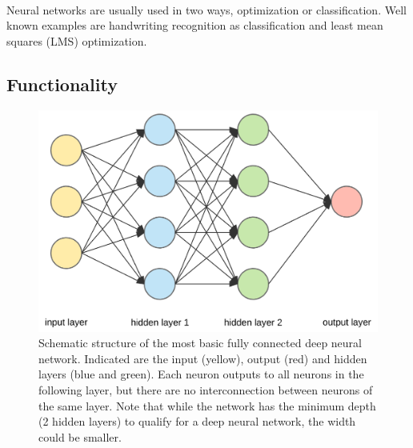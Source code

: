 		~\\
		Neural networks are usually used in two ways, optimization or classification. Well known examples are handwriting recognition as classification and least mean squares (LMS) optimization.
		\subsection{Functionality}
			\label{NNExample}
			
			\begin{figure}
				\includegraphics[width=\textwidth]{images/simpleNN.png}
				\caption{Schematic structure of the most basic fully connected deep neural network. Indicated are the input (yellow), output (red) and hidden layers (blue and green). Each neuron outputs to all neurons in the following layer, but there are no interconnection between neurons of the same layer. Note that while the network has the minimum depth (2 hidden layers) to qualify for a deep neural network, the width  could be smaller.}
				\label{Img_NNFully}
			\end{figure}

